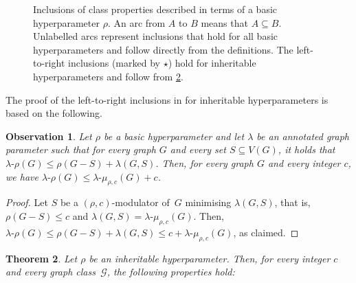 \documentclass[11pt]{article}
\newcommand{\rhocm}{\mu_{\rho,c}}
\theoremstyle{plain}
\newtheorem{theorem}{Theorem}[section]
\newtheorem{observation}[theorem]{Observation}
\theoremstyle{definition}
\theoremstyle{remark}
\numberwithin{equation}{section}
\begin{document}
\begin{figure}[h!]
    \caption{Inclusions of class properties described in terms of a basic hyperparameter $\rho$.
    An arc from $A$ to $B$ means that $A \subseteq B$.
    Unlabelled arcs represent inclusions that hold for all basic hyperparameters and follow directly from the definitions.  
    The left-to-right inclusions (marked by $\star$) hold for inheritable hyperparameters and follow from \cref{thm:alpha-rho at most alpha-rhocm}.}
    \label{fig questions}
\end{figure}

The proof of the left-to-right inclusions in  for inheritable hyperparameters is based on the following. 

\begin{observation}\label{lambda-rho at most lambda-rhocm}
Let $\rho$ be a basic hyperparameter and let $\lambda$ be an annotated graph parameter such that for every graph $G$ and every set $S\subseteq V(G)$, it holds that $\lambda\text{-}\rho(G)\le \rho(G-S) + \lambda(G,S)$.
Then, for every graph $G$ and every integer $c$, we have $\lambda\text{-}\rho(G)\le \lambda\text{-}\rhocm(G) + c$.
\end{observation}

\begin{proof}
Let $S$ be a \hbox{$(\rho,c)$-modulator} of~$G$ minimising $\lambda(G,S)$, that is, $\rho(G-S)\le c$ and $\lambda(G,S) = \lambda\text{-}\rhocm(G)$.
Then, $\lambda\text{-}\rho(G)\le \rho(G-S)+\lambda(G,S) \le c + \lambda\text{-}\rhocm(G)$, as claimed.
\end{proof}

\begin{theorem}\label{thm:alpha-rho at most alpha-rhocm}
Let $\rho$ be an inheritable hyperparameter.
Then, for every integer $c$ and every graph class~$\mathcal{G}$, the following properties hold:
\end{theorem}
\end{document}
